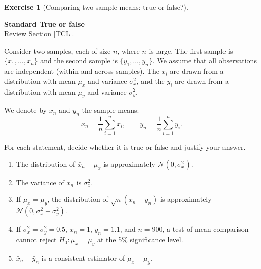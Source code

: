 \documentclass[
  11pt,
]{book}
\theoremstyle{definition}
\theoremstyle{definition}
\theoremstyle{definition}
\newtheorem{exercise}{Exercise}[chapter]
\theoremstyle{definition}
\theoremstyle{remark}
\begin{document}
\begin{exercisebox}

\begin{exercise}[Comparing two sample means: true or false?]
\protect\hypertarget{exr:clt-two-samples-true-false}{}\label{exr:clt-two-samples-true-false}

\textbf{Standard \textbar{} True or false}\\
Review Section \ref{TCL}.

Consider two samples, each of size \(n\), where \(n\) is large. The first sample is \(\{x_1,\dots,x_n\}\) and the second sample is \(\{y_1,\dots,y_n\}\). We assume that all observations are independent (within and across samples). The \(x_i\) are drawn from a distribution with mean \(\mu_x\) and variance \(\sigma_x^2\), and the \(y_i\) are drawn from a distribution with mean \(\mu_y\) and variance \(\sigma_y^2\).

We denote by \(\bar{x}_n\) and \(\bar{y}_n\) the sample means: \[\bar{x}_n=\frac{1}{n}\sum_{i=1}^n x_i,
\qquad
\bar{y}_n=\frac{1}{n}\sum_{i=1}^n y_i.\]

For each statement, decide whether it is true or false and justify your answer.

\begin{enumerate}
\def\labelenumi{\arabic{enumi}.}
\item
  The distribution of \(\bar{x}_n-\mu_x\) is approximately \(\mathcal{N}(0,\sigma_x^2)\).
\item
  The variance of \(\bar{x}_n\) is \(\sigma_x^2\).
\item
  If \(\mu_x=\mu_y\), the distribution of \(\sqrt{n}(\bar{x}_n-\bar{y}_n)\) is approximately \(\mathcal{N}(0,\sigma_x^2+\sigma_y^2)\).
\item
  If \(\sigma_x^2=\sigma_y^2=0.5\), \(\bar{x}_n=1\), \(\bar{y}_n=1.1\), and \(n=900\), a test of mean comparison cannot reject \(H_0:\mu_x=\mu_y\) at the 5\% significance level.
\item
  \(\bar{x}_n-\bar{y}_n\) is a consistent estimator of \(\mu_x-\mu_y\).
\end{enumerate}

\end{exercise}

\end{exercisebox}

\end{document}
